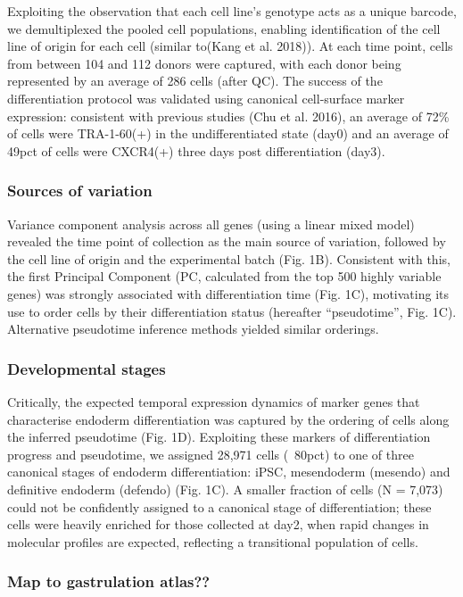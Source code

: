  Exploiting the observation that each cell line’s genotype acts as a unique barcode, we demultiplexed the pooled cell populations, enabling identification of the cell line of origin for each cell (similar to(Kang et al. 2018)). 
 At each time point, cells from between 104 and 112 donors were captured, with each donor being represented by an average of 286 cells (after QC). 
 The success of the differentiation protocol was validated using canonical cell-surface marker expression: consistent with previous studies (Chu et al. 2016), an average of 72\% of cells were TRA-1-60(+) in the undifferentiated state (day0) and an average of 49pct of cells were CXCR4(+) three days post differentiation (day3).

\subsubsection{Sources of variation} 

Variance component analysis across all genes (using a linear mixed model) revealed the time point of collection as the main source of variation, followed by the cell line of origin and the experimental batch (Fig. 1B). 
Consistent with this, the first Principal Component (PC, calculated from the top 500 highly variable genes) was strongly associated with differentiation time (Fig. 1C), motivating its use to order cells by their differentiation status (hereafter “pseudotime”, Fig. 1C).
Alternative pseudotime inference methods yielded similar orderings.

\subsubsection{Developmental stages}
 
Critically, the expected temporal expression dynamics of marker genes that characterise endoderm differentiation was captured by the ordering of cells along the inferred pseudotime (Fig. 1D). 
Exploiting these markers of differentiation progress and pseudotime, we assigned 28,971 cells (~80pct) to one of three canonical stages of endoderm differentiation: iPSC, mesendoderm (mesendo) and definitive endoderm (defendo) (Fig. 1C). 
A smaller fraction of cells (N = 7,073) could not be confidently assigned to a canonical stage of differentiation; these cells were heavily enriched for those collected at day2, when rapid changes in molecular profiles are expected, reflecting a transitional population of cells.

\subsubsection{Map to gastrulation atlas??}


